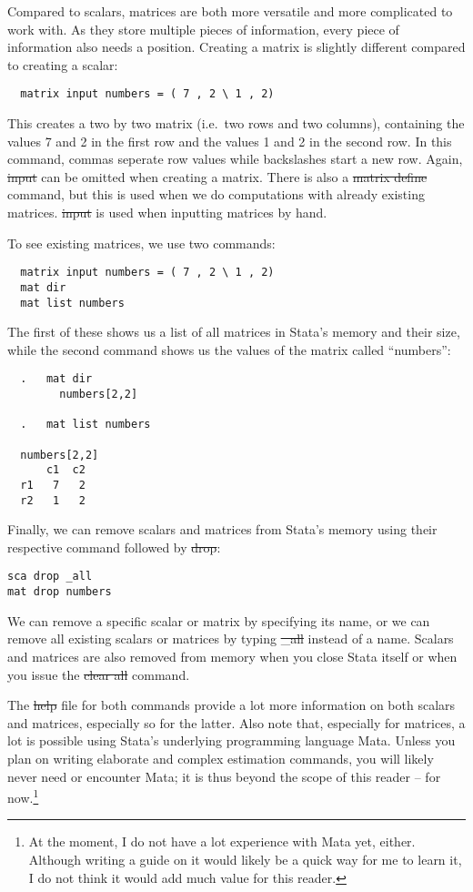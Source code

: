 Compared to scalars, matrices are both more versatile and more complicated to work with.
As they store multiple pieces of information, every piece of information also needs a position.
Creating a matrix is slightly different compared to creating a scalar:
\begin{verbatim}
  matrix input numbers = ( 7 , 2 \ 1 , 2)
\end{verbatim}
This creates a two by two matrix (i.e.\ two rows and two columns),
containing the values 7 and 2 in the first row and the values 1 and 2 in the second row.
In this command, commas seperate row values while backslashes start a new row.
Again, \st{input} can be omitted when creating a matrix.
There is also a \st{matrix define} command,
but this is used when we do computations with already existing matrices.
\st{input} is used when inputting matrices by hand.

To see existing matrices, we use two commands:
\begin{verbatim}
  matrix input numbers = ( 7 , 2 \ 1 , 2)
  mat dir
  mat list numbers
\end{verbatim}
The first of these shows us a list of all matrices in Stata's memory and their size,
while the second command shows us the values of the matrix called ``numbers'':
\small\begin{verbatim}
  .   mat dir
        numbers[2,2]

  .   mat list numbers

  numbers[2,2]
      c1  c2
  r1   7   2
  r2   1   2
\end{verbatim}\normalsize

Finally,
we can remove scalars and matrices from Stata's memory using their respective command followed by \st{drop}:
\begin{verbatim}
sca drop _all
mat drop numbers
\end{verbatim}
We can remove a specific scalar or matrix by specifying its name,
or we can remove all existing scalars or matrices by typing \st{_all} instead of a name.
Scalars and matrices are also removed from memory when you close Stata itself or when you issue the \st{clear all} command.

The \st{help} file for both commands provide a lot more information on both scalars and matrices, especially so for the latter.
Also note that, especially for matrices, a lot is possible using Stata's underlying programming language Mata.
Unless you plan on writing elaborate and complex estimation commands,
you will likely never need or encounter Mata;
it is thus beyond the scope of this reader -- for now.\footnote{At the moment, I do not have a lot experience with Mata yet, either. Although writing a guide on it would likely be a quick way for me to learn it, I do not think it would add much value for this reader.}


